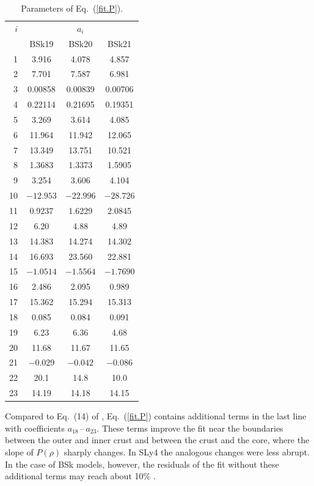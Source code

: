 \documentclass{aa}
\newcommand{\req}[1]{Eq.~(\ref{#1})}
\begin{document}
\begin{table}
\centering
\caption[]{Parameters of \req{fit.P}.}
\label{tab:fit.P}
\begin{tabular}{r|ccc}
\hline\hline\rule[-1.4ex]{0pt}{4.3ex}
$i$ & \multicolumn{3}{c}{$a_i$}\\
  & BSk19 & BSk20 & BSk21  \\
\hline\rule{0pt}{2.7ex}
1  & 3.916 &     4.078 &   4.857 \\
2  & 7.701 &     7.587 &   6.981 \\
3  & 0.00858 &   0.00839 & 0.00706 \\
4  & 0.22114 &   0.21695 & 0.19351 \\
5  & 3.269 &     3.614 &   4.085 \\
6  & 11.964 &    11.942 &  12.065 \\
7  & 13.349 &    13.751 &  10.521 \\
8  & 1.3683 &    1.3373 &  1.5905 \\
9  &  3.254 &    3.606 &   4.104 \\
10 &  $-12.953$ &  $-22.996$ & $-28.726$ \\
11 &  0.9237 &   1.6229 &  2.0845 \\
12 &  6.20 &     4.88 &    4.89 \\
13 &  14.383 &   14.274 &  14.302 \\
14 &  16.693 &   23.560 &  22.881 \\
15 &  $-1.0514$ &  $-1.5564$ & $-1.7690$ \\
16 &  2.486 &    2.095 &   0.989 \\
17 & 15.362 &    15.294 &  15.313 \\
18 & 0.085 &     0.084 &   0.091 \\
19 & 6.23 &      6.36 &    4.68 \\
20 & 11.68 &     11.67 &   11.65 \\
21 & $-0.029$ &    $-0.042$ &  $-0.086$ \\
22 & 20.1 &      14.8 &    10.0 \\
23 & 14.19 &     14.18 &   14.15 \\
\hline\hline
\end{tabular}
\end{table}

Compared to Eq.~(14) of \citet{HP04},
\req{fit.P} contains
additional terms in the last line with coefficients
$a_{18}$\,--\,$a_{23}$. These terms improve the fit near the
boundaries between the outer and inner crust and between the
crust and the core, where the slope of $P(\rho)$ sharply
changes. In SLy4 the analogous changes were less abrupt.
In the case of BSk models, however, the residuals of the fit
without these additional terms may reach about 10\%
\citep{Fantina-ea12}.
\end{document}
